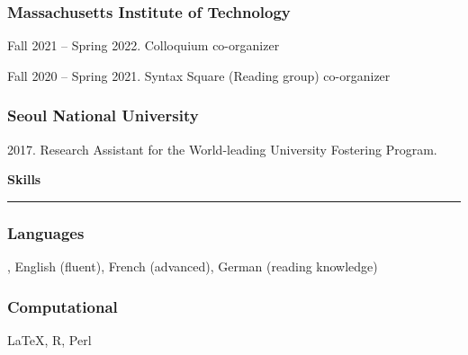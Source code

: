 \documentclass[10pt]{article}
\newcommand{\sect}[1]{\vspace{5mm} {\fontsize{14}{21}\selectfont \textbf{#1}} {\vspace{0.1cm}} \hrule {\vspace{0.3cm}}}
\begin{document}
\subsubsection*{Massachusetts Institute of Technology}
Fall 2021 -- Spring 2022. Colloquium co-organizer

Fall 2020 -- Spring 2021. Syntax Square (Reading group) co-organizer

\subsubsection*{Seoul National University}
{2017. Research Assistant for the World-leading University Fostering Program.}

\vspace{\baselineskip}

\sect{Skills}

\subsubsection*{Languages}
, English (fluent), French (advanced), German (reading knowledge)
\subsubsection*{Computational}
 {\LaTeX}, R, Perl
\end{document}
